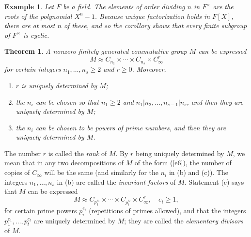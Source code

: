 \documentclass[a4paper,11pt,final]{memoir}%
\newtheorem{theorem}[X]{Theorem}
\newtheorem{example}[X]{Example}
\theoremstyle{nonumberplain}
\begin{document}
\begin{example}
\label{it20b}Let $F$ be a field. The elements of order dividing $n$ in
$F^{\times}$ are the roots of the polynomial $X^{n}-1$. Because unique
factorization holds in $F[X]$, there are at most $n$ of these, and so the
corollary shows that every finite subgroup of $F^{\times}$ is cyclic.
\end{example}

\begin{theorem}
\label{it21}%
%
A nonzero finitely generated commutative group $M$ can be expressed%
\begin{equation}
M\approx C_{n_{1}}\times\cdots\times C_{n_{s}}\times C_{\infty}^{r} \label{e6}%
\end{equation}
for certain integers $n_{1},\ldots,n_{s}\geq2$ and $r\geq0$. Moreover,

\begin{enumerate}
\item $r$ is uniquely determined by $M$;

\item the $n_{i}$ can be chosen so that $n_{1}\geq2$ and $n_{1}|n_{2}%
,\ldots,n_{s-1}|n_{s}$, and then they are uniquely determined by $M$;

\item the $n_{i}$ can be chosen to be powers of prime numbers, and then they
are uniquely determined by $M$.
\end{enumerate}
\end{theorem}

The number $r$ is called the \emph{rank}%
of $M$. By $r$ being uniquely determined by $M$, we mean that in any two
decompositions of $M$ of the form (\ref{e6}), the number of copies of
$C_{\infty}$ will be the same (and similarly for the $n_{i}$ in (b) and (c)).
The integers $n_{1},\ldots,n_{s}$ in (b) are called the \emph{invariant
factors}%
of $M$. Statement (c) says that $M$ can be expressed%
\begin{equation}
M\approx C_{p_{1}^{e_{1}}}\times\cdots\times C_{p_{t}^{e_{t}}}\times
C_{\infty}^{r},\quad e_{i}\geq1, \label{e7}%
\end{equation}
for certain prime powers $p_{i}^{e_{i}}$ (repetitions of primes allowed), and
that the integers $p_{1}^{e_{1}},\ldots,p_{t}^{e_{t}}$ are uniquely determined
by $M$; they are called the \emph{elementary divisors}%
of $M$.
\end{document}
